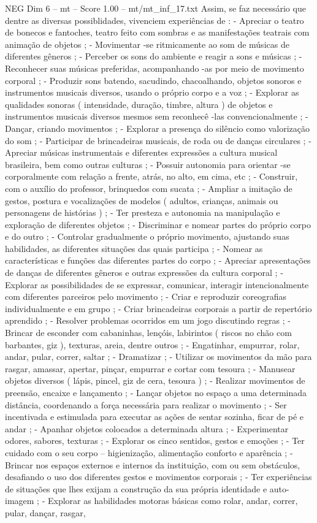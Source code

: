 \begin{textsample}{NEG Dim 6 – mt – Score 1.00 – mt/mt\_inf\_17.txt}
Assim, se faz necessário que dentre as diversas possiblidades, vivenciem experiências de : - Apreciar o teatro de bonecos e fantoches, teatro feito com sombras e as manifestações teatrais com animação de objetos ; - Movimentar -se ritmicamente ao som de músicas de diferentes gêneros ; - Perceber os sons do ambiente e reagir a sons e músicas ; - Reconhecer suas músicas preferidas, acompanhando -as por meio de movimento corporal ; - Produzir sons batendo, sacudindo, chacoalhando, objetos sonoros e instrumentos musicais diversos, usando o próprio corpo e a voz ; - Explorar as qualidades sonoras ( intensidade, duração, timbre, altura ) de objetos e instrumentos musicais diversos mesmos sem reconhecê -las convencionalmente ; - Dançar, criando movimentos ; - Explorar a presença do silêncio como valorização do som ; - Participar de brincadeiras musicais, de roda ou de danças circulares ; - Apreciar músicas instrumentais e diferentes expressões a cultura musical brasileira, bem como outras culturas ; - Possuir autonomia para orientar -se corporalmente com relação a frente, atrás, no alto, em cima, etc ; - Construir, com o auxílio do professor, brinquedos com sucata ; - Ampliar a imitação de gestos, postura e vocalizações de modelos ( adultos, crianças, animais ou personagens de histórias ) ; - Ter presteza e autonomia na manipulação e exploração de diferentes objetos ; - Discriminar e nomear partes do próprio corpo e do outro ; - Controlar gradualmente o próprio movimento, ajustando suas habilidades, as diferentes situações das quais participa ; - Nomear as características e funções das diferentes partes do corpo ; - Apreciar apresentações de danças de diferentes gêneros e outras expressões da cultura corporal ; - Explorar as possibilidades de se expressar, comunicar, interagir intencionalmente com diferentes parceiros pelo movimento ; - Criar e reproduzir coreografias individualmente e em grupo ; - Criar brincadeiras corporais a partir de repertório aprendido ; - Resolver problemas ocorridos em um jogo discutindo regras ; - Brincar de esconder com cabaninhas, lençóis, labirintos ( riscos no chão com barbantes, giz ), texturas, areia, dentre outros ; - Engatinhar, empurrar, rolar, andar, pular, correr, saltar ; - Dramatizar ; - Utilizar os movimentos da mão para rasgar, amassar, apertar, pinçar, empurrar e cortar com tesoura ; - Manusear objetos diversos ( lápis, pincel, giz de cera, tesoura ) ; - Realizar movimentos de preensão, encaixe e lançamento ; - Lançar objetos no espaço a uma determinada distância, coordenando a força necessária para realizar o movimento ; - Ser incentivada e estimulada para executar as ações de sentar sozinha, ficar de pé e andar ; - Apanhar objetos colocados a determinada altura ; - Experimentar odores, sabores, texturas ; - Explorar os cinco sentidos, gestos e emoções ; - Ter cuidado com o seu corpo – higienização, alimentação conforto e aparência ; - Brincar nos espaços externos e internos da instituição, com ou sem obstáculos, desafiando o uso dos diferentes gestos e movimentos corporais ; - Ter experiências de situações que lhes exijam a construção da sua própria identidade e auto-imagem ; - Explorar as habilidades motoras básicas como rolar, andar, correr, pular, dançar, rasgar, 
\end{textsample}
